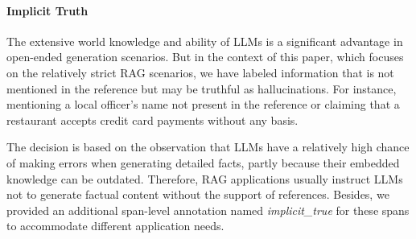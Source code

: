 \documentclass[11pt]{article}
\begin{document}

\paragraph{Implicit Truth} The extensive world knowledge and ability of LLMs is a significant advantage in open-ended generation scenarios. But in the context of this paper, which focuses on the relatively strict RAG scenarios, we have labeled information that is not mentioned in the reference but may be truthful as hallucinations. 
For instance, mentioning a local officer's name not present in the reference or claiming that a restaurant accepts credit card payments without any basis.

The decision is based on the observation that LLMs have a relatively high chance of making errors when generating detailed facts, partly because their embedded knowledge can be outdated. Therefore, RAG applications usually instruct LLMs not to generate factual content without the support of references.
Besides, we provided an additional span-level annotation named \textit{implicit\_true} for these spans to accommodate different application needs. 
\end{document}
